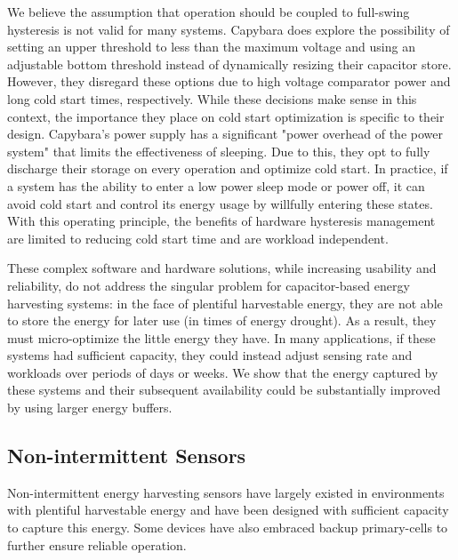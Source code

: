 We believe the assumption that operation should be coupled to full-swing hysteresis
is not valid
for many systems. Capybara does explore the possibility of setting an upper
threshold to less than the maximum voltage and using an adjustable bottom
threshold instead of dynamically resizing their capacitor store.
However, they disregard these options due to high voltage comparator
power and long cold start times, respectively.
While these decisions make sense in this context, the importance they place on cold start optimization
is specific to their design. Capybara's power supply has a significant
"power overhead of the power system" that limits the effectiveness of
sleeping. Due to this, they opt to fully discharge their storage on every
operation and optimize cold start.  In practice, if a system has the ability to
enter a low power sleep mode or power off, it can
avoid cold start and control its energy usage by willfully entering these
states. With this operating principle, the benefits of hardware hysteresis management
are limited to reducing cold start time and are workload independent.

These complex software and hardware solutions, while increasing usability and reliability, do not address the singular problem for capacitor-based energy
harvesting systems: in the face of plentiful harvestable energy, they are not
able to store the energy for later use (in times of energy drought).
As a result, they must
micro-optimize the little energy they have.  In many applications, if these
systems had sufficient capacity, they could instead adjust sensing rate and
workloads over periods of days or weeks.  We show that the energy captured
by these systems and their subsequent availability
could be substantially improved by using larger energy buffers.
\subsection{Non-intermittent Sensors}
\label{sec:related:nonintermittent}
Non-intermittent energy harvesting sensors
have largely existed in environments with plentiful harvestable energy
and have been designed with sufficient capacity to capture this energy. Some
devices have also embraced backup primary-cells to further ensure
reliable operation.  \\

